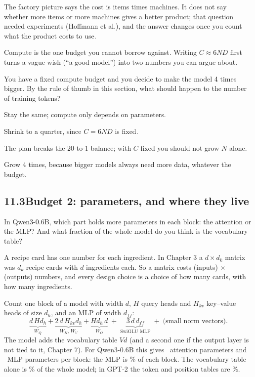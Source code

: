 \begin{breaks}
The factory picture says the cost is items times machines. It does not say whether more items or more
machines gives a better product; that question needed experiments (Hoffmann et al.), and the answer
changes once you count what the product costs to use.
\end{breaks}

\Why Compute is the one budget you cannot borrow against. Writing $C\approx6ND$ first turns a vague wish
(``a good model'') into two numbers you can argue about.

\begin{checkq}
You have a fixed compute budget and you decide to make the model 4 times bigger. By the rule of thumb in
this section, what should happen to the number of training tokens?
\begin{options}
\item Stay the same; compute only depends on parameters.
\item Shrink to a quarter, since $C=6ND$ is fixed.
\item The plan breaks the 20-to-1 balance; with $C$ fixed you should not grow $N$ alone.
\item Grow 4 times, because bigger models always need more data, whatever the budget.
\end{options}
\end{checkq}


\subsection*{11.3\quad Budget 2: parameters, and where they live}

\Predict In Qwen3-0.6B, which part holds more parameters in each block: the attention or the MLP? And
what fraction of the whole model do you think is the vocabulary table?

\Picture A recipe card has one number for each ingredient. In Chapter 3 a $d\times d_k$ matrix was $d_k$
recipe cards with $d$ ingredients each. So a matrix costs (inputs) $\times$ (outputs) numbers, and
every design choice is a choice of how many cards, with how many ingredients.

\Exactly Count one block of a model with width $d$, $H$ query heads and $H_{kv}$ key--value heads of size
$d_h$, and an MLP of width $d_{ff}$:
\[
\underbrace{d\,H d_h}_{W_Q} + \underbrace{2\,d\,H_{kv} d_h}_{W_K,\,W_V} + \underbrace{H d_h\, d}_{W_O}
\;+\; \underbrace{3\,d\,d_{ff}}_{\text{SwiGLU MLP}} \;+\; \text{(small norm vectors)}.
\]
The model adds the vocabulary table $V d$ (and a second one if the output layer is not tied to it,
Chapter 7). For Qwen3-0.6B this gives \nElevenQwenAttn\ attention parameters and \nElevenQwenMlp\ MLP
parameters per block: the MLP is \nElevenQwenMlpShare\% of each block. The vocabulary table alone is
\nElevenQwenEmbShare\% of the whole model; in GPT-2 the token and position tables are \nElevenGptEmbShare\%.

